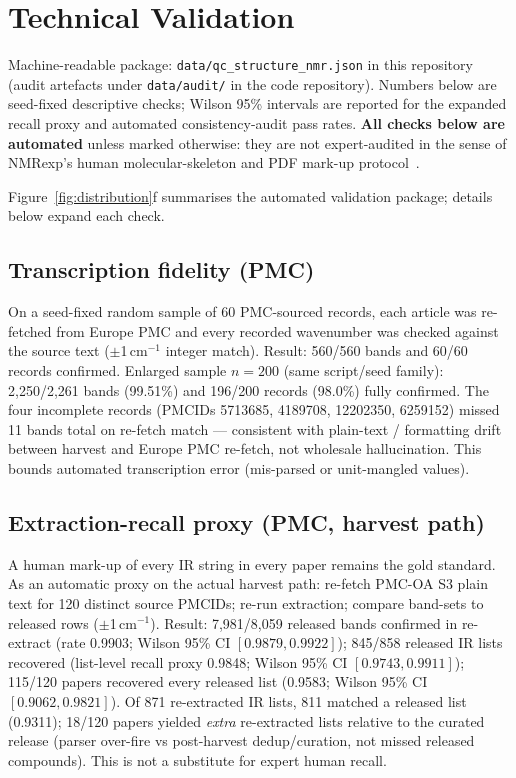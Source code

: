 \documentclass[pdflatex,sn-nature]{sn-jnl}
\begin{document}
\section{Technical Validation}\label{sec:techval}

Machine-readable package: \texttt{data/qc\_structure\_nmr.json} in this
repository (audit artefacts under \texttt{data/audit/} in the code repository).
Numbers below are seed-fixed descriptive checks; Wilson 95\% intervals are
reported for the expanded recall proxy and automated consistency-audit pass rates.
\textbf{All checks below are automated} unless marked otherwise: they are not
expert-audited in the sense of NMRexp's human molecular-skeleton and PDF mark-up
protocol~\citep{wang2025nmrexp}.

Figure~\ref{fig:distribution}f summarises the automated validation package;
details below expand each check.

\subsection{Transcription fidelity (PMC)}

On a seed-fixed random sample of 60 PMC-sourced records, each article was
re-fetched from Europe PMC and every recorded wavenumber was checked against the
source text ($\pm$1\,cm$^{-1}$ integer match).
Result: 560/560 bands and 60/60 records confirmed.
Enlarged sample $n=200$ (same script/seed family): 2,250/2,261 bands (99.51\%) and
196/200 records (98.0\%) fully confirmed.
The four incomplete records (PMCIDs 5713685, 4189708, 12202350, 6259152) missed
11 bands total on re-fetch match --- consistent with plain-text / formatting
drift between harvest and Europe PMC re-fetch, not wholesale hallucination.
This bounds automated transcription error (mis-parsed or unit-mangled values).

\subsection{Extraction-recall proxy (PMC, harvest path)}

A human mark-up of every IR string in every paper remains the gold standard.
As an automatic proxy on the actual harvest path: re-fetch PMC-OA S3 plain text
for 120 distinct source PMCIDs; re-run extraction; compare band-sets to released
rows ($\pm$1\,cm$^{-1}$).
Result: 7,981/8,059 released bands confirmed in re-extract (rate 0.9903;
Wilson 95\% CI $[0.9879, 0.9922]$);
845/858 released IR lists recovered (list-level recall proxy 0.9848;
Wilson 95\% CI $[0.9743, 0.9911]$);
115/120 papers recovered every released list (0.9583;
Wilson 95\% CI $[0.9062, 0.9821]$).
Of 871 re-extracted IR lists, 811 matched a released list (0.9311);
18/120 papers yielded \emph{extra} re-extracted lists relative to the curated
release (parser over-fire vs post-harvest dedup/curation, not missed released
compounds).
This is not a substitute for expert human recall.
\end{document}
